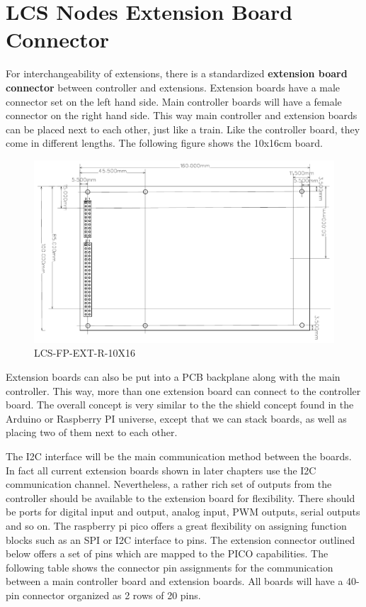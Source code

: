 \section{LCS Nodes Extension Board Connector}

For interchangeability of extensions, there is a standardized \textbf{extension board connector} between controller and extensions. Extension boards have a male connector set on the left hand side. Main controller boards will have a female connector on the right hand side. This way main controller and extension boards can be placed next to each other, just like a train. Like the controller board, they come in different lengths. The following figure shows the 10x16cm board. 

\begin{figure}[htbp]
    \centering
    \includegraphics[page=1, scale=0.7]{./Figures/LCS-FP-EXT-L-10X16.pdf}
    \caption{LCS-FP-EXT-R-10X16}
\end{figure}

Extension boards can also be put into a PCB backplane along with the main controller. This way, more than one extension board can connect to the controller board. The overall concept is very similar to the the shield concept found in the Arduino or Raspberry PI universe, except that we can stack boards, as well as placing two of them next to each other. 

The I2C interface will be the main communication method between the boards. In fact all current extension boards shown in later chapters use the I2C communication channel. Nevertheless, a rather rich set of outputs from the controller should be available to the extension board for flexibility. There should be ports for digital input and output, analog input, PWM outputs, serial outputs and so on. The raspberry pi pico offers a great flexibility on assigning function blocks such as an SPI or I2C interface to pins. The extension connector outlined below offers a set of pins which are mapped to the PICO capabilities. The following table shows the connector pin assignments for the communication between a main controller board and extension boards. All boards will have a 40-pin connector organized as 2 rows of 20 pins.

